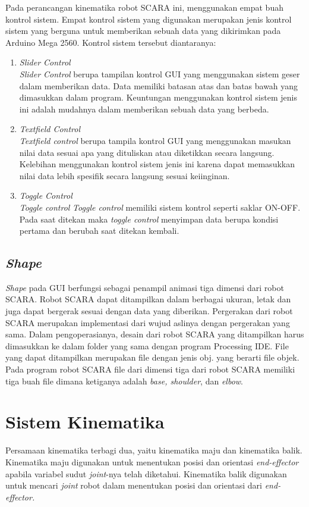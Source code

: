 Pada perancangan kinematika robot SCARA ini, menggunakan empat buah kontrol sistem. Empat kontrol sistem yang digunakan merupakan jenis kontrol sistem yang berguna untuk memberikan sebuah data yang dikirimkan pada Arduino Mega 2560. Kontrol sistem tersebut diantaranya:
\begin{enumerate}
	\item \textit{Slider Control} \\
	\textit{Slider Control} berupa tampilan kontrol GUI yang menggunakan sistem geser dalam memberikan data. Data memiliki batasan atas dan batas bawah yang dimasukkan dalam program. Keuntungan menggunakan kontrol sistem jenis ini adalah mudahnya dalam memberikan sebuah data yang berbeda.


	\item \textit{Textfield Control} \\
\textit{Textfield control} berupa tampila kontrol GUI yang menggunakan masukan nilai data sesuai apa yang dituliskan atau diketikkan secara langsung. Kelebihan menggunakan kontrol sistem jenis ini karena dapat memasukkan nilai data lebih spesifik secara langsung sesuai keiinginan.
	

	\item \textit{Toggle Control} \\
\textit{Toggle control}
\textit{Toggle control} memiliki sistem kontrol seperti saklar ON-OFF. Pada saat ditekan maka \textit{toggle control} menyimpan data berupa kondisi pertama dan berubah saat ditekan kembali. 

\end{enumerate}
\subsection{\textit{Shape}}
\textit{Shape} pada GUI berfungsi sebagai penampil animasi tiga dimensi dari robot SCARA. Robot SCARA dapat ditampilkan dalam berbagai ukuran, letak dan juga dapat bergerak sesuai dengan data yang diberikan. Pergerakan dari robot SCARA merupakan implementasi dari wujud aslinya dengan pergerakan yang sama. Dalam pengoperasianya, desain dari robot SCARA yang ditampilkan harus dimasukkan ke dalam folder yang sama dengan program Processing IDE. File yang dapat ditampilkan merupakan file dengan jenis obj. yang berarti file objek. Pada program robot SCARA file dari dimensi tiga dari robot SCARA memiliki tiga buah file dimana ketiganya adalah \textit{base, shoulder}, dan \textit{elbow}. 

\section{Sistem Kinematika}
Persamaan kinematika terbagi dua, yaitu kinematika maju dan kinematika balik. Kinematika maju digunakan untuk menentukan posisi dan orientasi \textit{end-effector} apabila variabel sudut \textit{joint}-nya telah diketahui. Kinematika balik digunakan untuk mencari \textit{joint} robot dalam menentukan posisi dan orientasi dari \textit{end-effector.}
